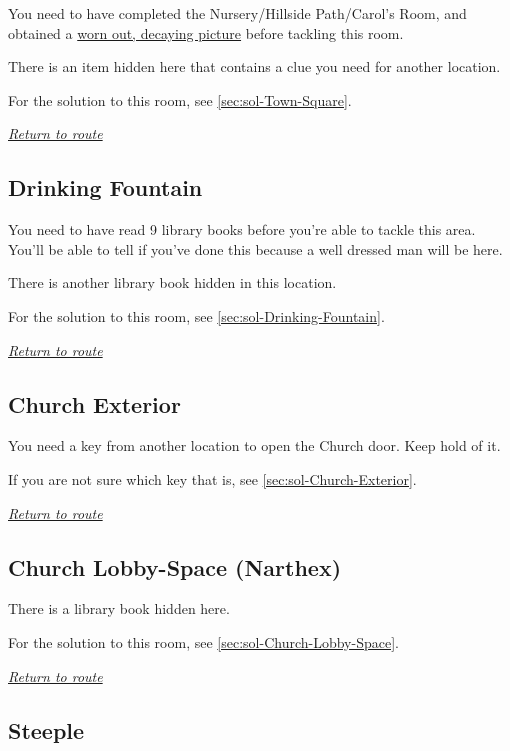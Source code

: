 \documentclass[a5paper]{extarticle}
\begin{document}
You need to have completed the Nursery\slash Hillside Path\slash Carol's Room,
and obtained a \hyperref[sec:nb-picture-riddle]{worn out, decaying picture}
before tackling this room.

There is an item hidden here that contains a clue you need for another location.

For the solution to this room, see \cref{sec:sol-Town-Square}.

\hyperref[sec:route-7]{\emph{Return to route}}

\newpage
\subsection{Drinking Fountain}\label{sec:req-Drinking-Fountain}

You need to have read 9 library books before you're able to tackle this area.
You'll be able to tell if you've done this because a well dressed man will be here.

There is another library book hidden in this location.

For the solution to this room, see \cref{sec:sol-Drinking-Fountain}.

\hyperref[sec:route-7]{\emph{Return to route}}

\newpage
\subsection{Church Exterior}\label{sec:req-Church-Exterior}

You need a key from another location to open the Church door. Keep hold of it.

If you are not sure which key that is, see \cref{sec:sol-Church-Exterior}.

\hyperref[sec:route-7]{\emph{Return to route}}

\newpage
\subsection{Church Lobby-Space (Narthex)}\label{sec:req-Church-Lobby-Space}

There is a library book hidden here.

For the solution to this room, see \cref{sec:sol-Church-Lobby-Space}.

\hyperref[sec:route-7]{\emph{Return to route}}

\newpage
\subsection{Steeple}\label{sec:req-Steeple-0}
\end{document}
